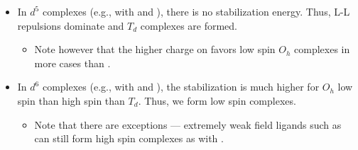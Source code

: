 \documentclass[../notes.tex]{subfiles}
\begin{document}
\begin{itemize}
\begin{itemize}
    \end{itemize}
    \item In $d^5$ complexes (e.g., with  and ), there is no stabilization energy. Thus, L-L repulsions dominate and $T_d$ complexes are formed.
    \begin{itemize}
        \item Note however that the higher charge on  favors low spin $O_h$ complexes in more cases than .
    \end{itemize}
    \item In $d^6$ complexes (e.g., with  and ), the stabilization is much higher for $O_h$ low spin than high spin than $T_d$. Thus, we form low spin complexes.
    \begin{itemize}
        \item Note that there are exceptions --- extremely weak field ligands such as  can still form high spin complexes as with .
    \end{itemize}
\end{itemize}
\end{document}
